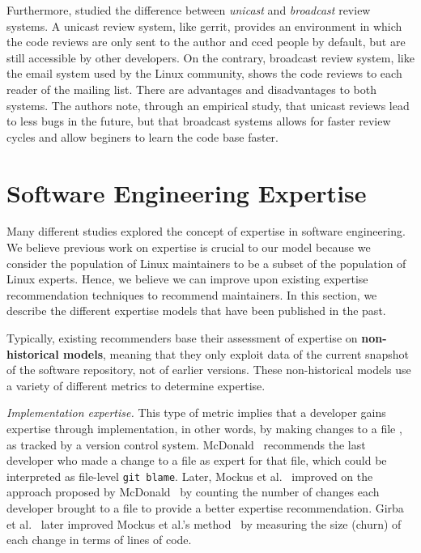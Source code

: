 Furthermore, \citep{armstrong} studied the difference between \textit{unicast} and \textit{broadcast} review systems. A unicast review system, like gerrit, provides an environment in which the code reviews are only sent to the author and cced people by default, but are still accessible by other developers. On the contrary, broadcast review system, like the email system used by the Linux community, shows the code reviews to each reader of the mailing list. There are advantages and disadvantages to both systems. The authors note, through an empirical study, that unicast reviews lead to less bugs in the future, but that broadcast systems allows for faster review cycles and allow beginers to learn the code base faster. 



\section{Software Engineering Expertise}
\label{sec:expertise_models}



Many different studies explored the concept of expertise in software engineering.
We believe previous work on expertise is crucial to our model because we consider the population of Linux maintainers to be a subset of the population of Linux experts. Hence, we believe we can improve upon existing expertise recommendation techniques to recommend maintainers. In this section, we describe the different expertise models that have been published in the past.


Typically, existing %
recommenders %
base their assessment of expertise on \textbf{non-historical models}, meaning that they only exploit data of the current snapshot of the software repository, not of earlier versions. These non-historical models use a variety of different metrics to determine expertise.

\textit{Implementation expertise.} This type of metric implies that a developer gains expertise through implementation, in other words, by making changes to a file%
, %
as tracked by a version control system. McDonald~\cite{McDonald} recommends the last developer who made a change to a file as expert for that file, which could be interpreted as file-level \texttt{git blame}. Later, Mockus et al.~\cite{mockus02} improved on the approach proposed by McDonald~\cite{McDonald} by counting the number of changes each developer brought to a file to provide a better expertise recommendation. Girba et al.~\cite{1572315} later improved Mockus et al.'s method~\cite{mockus02} by measuring the size (churn) of each change in terms of lines of code.  %

